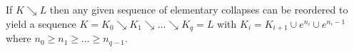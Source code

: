 If $K \searrow L$ then any given sequence of elementary collapses can be reordered to yield a sequence $K = K_0 \searrow K_1 \searrow \ldots \searrow K_q = L$ with $K_i = K_{i+1} \cup e^{n_i} \cup e^{n_i-1}$ where $n_0 \geq n_1 \geq \ldots \geq n_{q-1}$.
